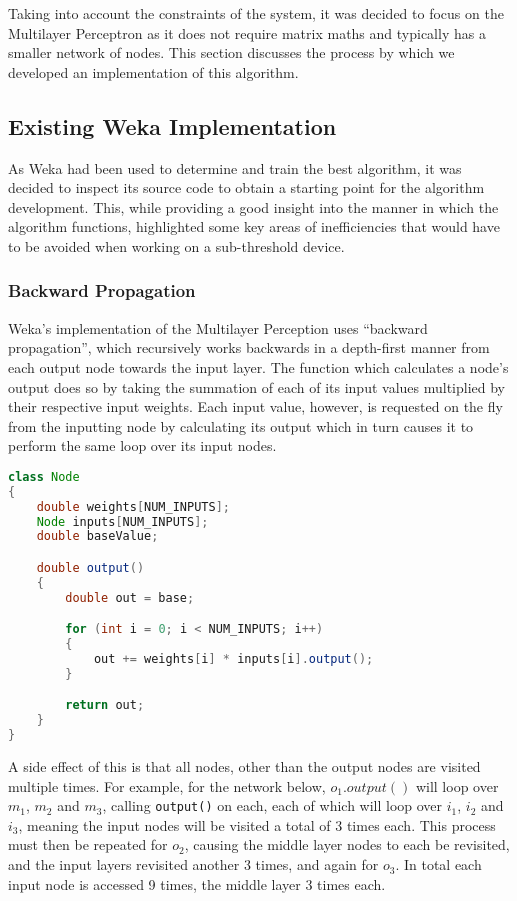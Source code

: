 
Taking into account the constraints of the system, it was decided to focus on the Multilayer Perceptron as it does not require matrix maths and typically has a smaller network of nodes. This section discusses the process by which we developed an implementation of this algorithm.

\subsection{Existing Weka Implementation \label{sec:weka-code}}

As Weka had been used to determine and train the best algorithm, it was decided to inspect its source code to obtain a starting point for the algorithm development. This, while providing a good insight into the manner in which the algorithm functions, highlighted some key areas of inefficiencies that would have to be avoided when working on a sub-threshold device.

\subsubsection{Backward Propagation}

Weka's implementation of the Multilayer Perception uses ``backward propagation'', which recursively works backwards in a depth-first manner from each output node towards the input layer. The function which calculates a node's output does so by taking the summation of each of its input values multiplied by their respective input weights. Each input value, however, is requested on the fly from the inputting node by calculating its output which in turn causes it to perform the same loop over its input nodes.

\begin{lstlisting}[language=Java,caption={Weka's method of calculating a node's output}]
class Node
{
    double weights[NUM_INPUTS];
    Node inputs[NUM_INPUTS];
    double baseValue;

    double output()
    {
        double out = base;

        for (int i = 0; i < NUM_INPUTS; i++)
        {
            out += weights[i] * inputs[i].output();
        }

        return out;
    }
}
\end{lstlisting}

A side effect of this is that all nodes, other than the output nodes are visited multiple times. For example, for the network below, $o_1.output()$ will loop over $m_1$, $m_2$ and $m_3$, calling \verb|output()| on each, each of which will loop over $i_1$, $i_2$ and $i_3$, meaning the input nodes will be visited a total of 3 times each. This process must then be repeated for $o_2$, causing the middle layer nodes to each be revisited, and the input layers revisited another 3 times, and again for $o_3$. In total each input node is accessed 9 times, the middle layer 3 times each.

